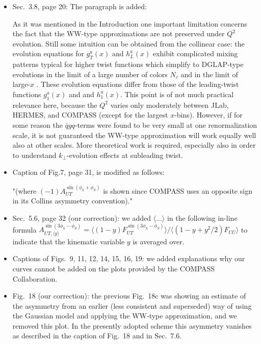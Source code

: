\documentclass[a4paper,11pt]{article}
\begin{document}
\begin{itemize}
\item
Sec.~3.8, page 20: The paragraph is added:

As it was mentioned in the Introduction one important limitation concerns 
the fact that the WW-type approximations are not preserved under $Q^2$ 
evolution. Still some intuition can be 
obtained from the collinear case: the evolution equations for $g_T^a(x)$ 
and $h_L^a(x)$ exhibit complicated mixing patterns typical for higher 
twist functions which simplify to DGLAP-type evolutions in the limit 
of a large number of colors $N_c$ and in the limit of large-$x$ 
\cite{Ali:1991em,Koike:1994st,Balitsky:1996uh,Belitsky:1997zw}. 
These evolution equations differ from those of the leading-twist
functions $g_1^a(x)$ and and $h_1^a(x)$. This point is of not much
practical relevance here, because the $Q^2$ varies only moderately
between JLab, HERMES, and COMPASS (except for the largest $x$-bins).
However, if for some reason the $\bar{q}gq$-terms were found to be
very small at one renormalization scale, it is not guaranteed the
WW-type approximation will work equally well also at other scales. 
 More theoretical work is required, especially also in order to 
understand $k_\perp$-evolution effects at subleading twist.


\item 
Caption of Fig.7, page 31, is modified as follows:

"(where $(-1)A_{UT}^{\sin(\phi_h+\phi_S)}$ is shown since COMPASS
 uses an opposite sign in its Collins asymmetry convention)."

\item
Sec.~5.6, page 32 (our correction): we added $\langle\dots\rangle$
in the following in-line formula  
$A_{UT, \langle y \rangle}^{\sin(3 \phi_h - \phi_S)}=\langle
(1-y)F_{UT}^{\sin(3 \phi_h - \phi_S)}\rangle/\langle(1-y + y^2/2)F_{UU}\rangle$
to indicate that the kinematic variable $y$ is averaged over.

\item
Captions of Figs.~9, 11, 12, 14, 15, 16, 19:
we added explanations why our curves cannot be added
on the plots provided by the COMPASS Collaboration.

\item
Fig.~18 (our correction):
the previous Fig.~18c was showing an estimate of the asymmetry
from an earlier (less consistent and superseded) way of using
the Gaussian model and applying the WW-type approximation, and 
we removed this plot. In the presently adopted scheme this
asymmetry vanishes as described in the caption of Fig.~18
and in Sec.~7.6.


\end{itemize}
\end{document}

